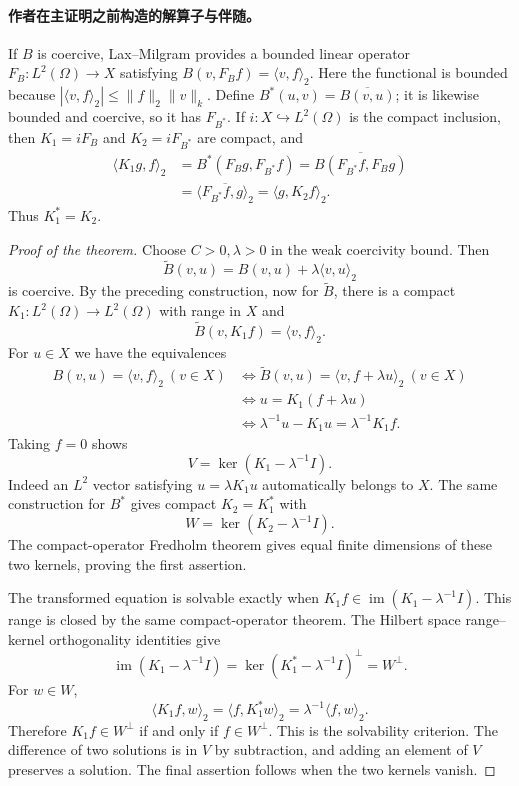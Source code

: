 \documentclass[UTF8,11pt]{ctexart}
\theoremstyle{definition}
\DeclareMathOperator{\im}{im}
\begin{document}
\paragraph{作者在主证明之前构造的解算子与伴随。}
If $B$ is coercive, Lax--Milgram provides a bounded linear operator
$F_B:L^2(\Omega)\to X$ satisfying
$B(v,F_Bf)=\langle v,f\rangle_2$. Here the functional is bounded because
$|\langle v,f\rangle_2|\leq\|f\|_2\|v\|_k$.
Define $B^*(u,v)=\overline{B(v,u)}$; it is likewise bounded and coercive,
so it has $F_{B^*}$. If $i:X\hookrightarrow L^2(\Omega)$ is the compact
inclusion, then $K_1=iF_B$ and $K_2=iF_{B^*}$ are compact, and
\begin{align*}
\langle K_1g,f\rangle_2
&=B^*(F_Bg,F_{B^*}f)
=\overline{B(F_{B^*}f,F_Bg)}\\
&=\overline{\langle F_{B^*}f,g\rangle_2}
=\langle g,K_2f\rangle_2.
\end{align*}
Thus $K_1^*=K_2$.
\begin{proof}[Proof of the theorem]
Choose $C>0,\lambda>0$ in the weak coercivity bound. Then
\[
\widetilde B(v,u)=B(v,u)+\lambda\langle v,u\rangle_2
\]
is coercive. By the preceding construction, now for $\widetilde B$,
there is a compact $K_1:L^2(\Omega)\to L^2(\Omega)$ with range in $X$
and
\[
\widetilde B(v,K_1f)=\langle v,f\rangle_2.
\]
For $u\in X$ we have the equivalences
\begin{align*}
 B(v,u)=\langle v,f\rangle_2\ (v\in X)
&\Longleftrightarrow\widetilde B(v,u)=\langle v,f+\lambda u\rangle_2\ (v\in X)\\
&\Longleftrightarrow u=K_1(f+\lambda u)\\
&\Longleftrightarrow \lambda^{-1}u-K_1u=\lambda^{-1}K_1f.
\end{align*}
Taking $f=0$ shows
\[
V=\ker(K_1-\lambda^{-1}I).
\]
Indeed an $L^2$ vector satisfying $u=\lambda K_1u$ automatically belongs
to $X$. The same construction for $B^*$ gives compact $K_2=K_1^*$ with
\[
W=\ker(K_2-\lambda^{-1}I).
\]
The compact-operator Fredholm theorem gives equal finite dimensions
of these two kernels, proving the first assertion.

The transformed equation is solvable exactly when
$K_1f\in\im(K_1-\lambda^{-1}I)$.
This range is closed by the same compact-operator theorem. The Hilbert
space range--kernel orthogonality identities give
\[
\im(K_1-\lambda^{-1}I)
=\ker(K_1^*-\lambda^{-1}I)^\perp=W^\perp.
\]
For $w\in W$,
\[
\langle K_1f,w\rangle_2
=\langle f,K_1^*w\rangle_2
=\lambda^{-1}\langle f,w\rangle_2.
\]
Therefore $K_1f\in W^\perp$ if and only if $f\in W^\perp$.
This is the solvability criterion. The difference of two solutions is
in $V$ by subtraction, and adding an element of $V$ preserves a solution.
The final assertion follows when the two kernels vanish.
\end{proof}
\end{document}
